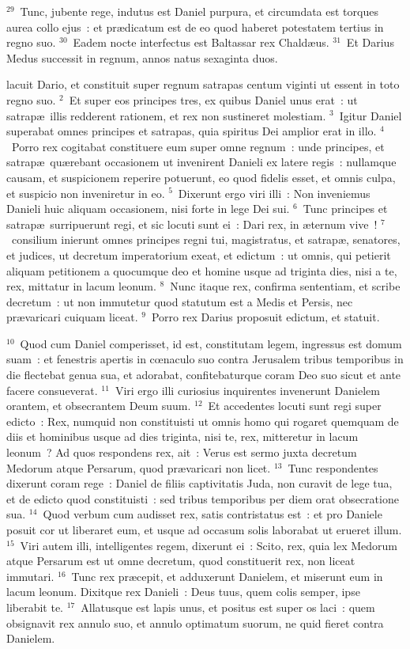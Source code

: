 ${}^{29}$~Tunc, jubente rege, indutus est Daniel purpura, et circumdata est torques aurea collo ejus~: et pr\ae dicatum est de eo quod haberet potestatem tertius in regno suo.
${}^{30}$~Eadem nocte interfectus est Baltassar rex Chald\ae us.
${}^{31}$~Et Darius Medus successit in regnum, annos natus sexaginta duos.

\bchapter
{}lacuit Dario, et constituit super regnum satrapas centum viginti ut essent in toto regno suo.
${}^{2}$~Et super eos principes tres, ex quibus Daniel unus erat~: ut satrap\ae\ illis redderent rationem, et rex non sustineret molestiam.
${}^{3}$~Igitur Daniel superabat omnes principes et satrapas, quia spiritus Dei amplior erat in illo.
${}^{4}$~Porro rex cogitabat constituere eum super omne regnum~: unde principes, et satrap\ae\ qu\ae rebant occasionem ut invenirent Danieli ex latere regis~: nullamque causam, et suspicionem reperire potuerunt, eo quod fidelis esset, et omnis culpa, et suspicio non inveniretur in eo.
${}^{5}$~Dixerunt ergo viri illi~: Non inveniemus Danieli huic aliquam occasionem, nisi forte in lege Dei sui.
${}^{6}$~Tunc principes et satrap\ae\ surripuerunt regi, et sic locuti sunt ei~: Dari rex, in \ae ternum vive~!
${}^{7}$~consilium inierunt omnes principes regni tui, magistratus, et satrap\ae , senatores, et judices, ut decretum imperatorium exeat, et edictum~: ut omnis, qui petierit aliquam petitionem a quocumque deo et homine usque ad triginta dies, nisi a te, rex, mittatur in lacum leonum.
${}^{8}$~Nunc itaque rex, confirma sententiam, et scribe decretum~: ut non immutetur quod statutum est a Medis et Persis, nec pr\ae varicari cuiquam liceat.
${}^{9}$~Porro rex Darius proposuit edictum, et statuit.


${}^{10}$~Quod cum Daniel comperisset, id est, constitutam legem, ingressus est domum suam~: et fenestris apertis in cœnaculo suo contra Jerusalem tribus temporibus in die flectebat genua sua, et adorabat, confitebaturque coram Deo suo sicut et ante facere consueverat.
${}^{11}$~Viri ergo illi curiosius inquirentes invenerunt Danielem orantem, et obsecrantem Deum suum.
${}^{12}$~Et accedentes locuti sunt regi super edicto~: Rex, numquid non constituisti ut omnis homo qui rogaret quemquam de diis et hominibus usque ad dies triginta, nisi te, rex, mitteretur in lacum leonum~? Ad quos respondens rex, ait~: Verus est sermo juxta decretum Medorum atque Persarum, quod pr\ae varicari non licet.
${}^{13}$~Tunc respondentes dixerunt coram rege~: Daniel de filiis captivitatis Juda, non curavit de lege tua, et de edicto quod constituisti~: sed tribus temporibus per diem orat obsecratione sua.
${}^{14}$~Quod verbum cum audisset rex, satis contristatus est~: et pro Daniele posuit cor ut liberaret eum, et usque ad occasum solis laborabat ut erueret illum.
${}^{15}$~Viri autem illi, intelligentes regem, dixerunt ei~: Scito, rex, quia lex Medorum atque Persarum est ut omne decretum, quod constituerit rex, non liceat immutari.
${}^{16}$~Tunc rex pr\ae cepit, et adduxerunt Danielem, et miserunt eum in lacum leonum. Dixitque rex Danieli~: Deus tuus, quem colis semper, ipse liberabit te.
${}^{17}$~Allatusque est lapis unus, et positus est super os laci~: quem obsignavit rex annulo suo, et annulo optimatum suorum, ne quid fieret contra Danielem.


